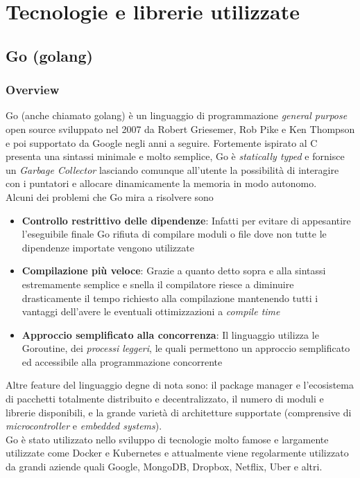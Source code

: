 \chapter{Tecnologie e librerie utilizzate}
\section{Go (golang)}
\subsection{Overview}
Go\cite{Go_Wikipedia} (anche chiamato {golang}) è un linguaggio di programmazione \emph{general purpose} open source sviluppato nel 2007 da Robert Griesemer, Rob Pike e Ken Thompson e poi supportato da Google negli anni a seguire. Fortemente ispirato al C presenta una sintassi minimale e molto semplice, Go è \emph{statically typed} e fornisce un \emph{Garbage Collector} lasciando comunque all'utente la possibilità di interagire con i puntatori e allocare dinamicamente la memoria in modo autonomo.\\
Alcuni dei problemi che Go mira a risolvere sono
\begin{itemize}
    \item \textbf{Controllo restrittivo delle dipendenze}: Infatti per evitare di appesantire l'eseguibile finale Go rifiuta di compilare moduli o file dove non tutte le dipendenze importate vengono utilizzate
    \item \textbf{Compilazione più veloce}: Grazie a quanto detto sopra e alla sintassi estremamente semplice e snella il compilatore riesce a diminuire drasticamente il tempo richiesto alla compilazione mantenendo tutti i vantaggi dell'avere le eventuali ottimizzazioni a \emph{compile time}
    \item \textbf{Approccio semplificato alla concorrenza}: Il linguaggio utilizza le Goroutine, dei \emph{processi leggeri}, le quali permettono un approccio semplificato ed accessibile alla programmazione concorrente
\end{itemize}
Altre feature del linguaggio degne di nota sono: il package manager e l'ecosistema di pacchetti totalmente distribuito  e decentralizzato, il numero di moduli e librerie disponibili, e la grande varietà di architetture supportate (comprensive di \emph{microcontroller} e \emph{embedded systems}).\\
Go è stato utilizzato nello sviluppo di tecnologie molto famose e largamente utilizzate come Docker e Kubernetes e attualmente viene regolarmente utilizzato da grandi aziende quali Google, MongoDB, Dropbox, Netflix, Uber e altri.

